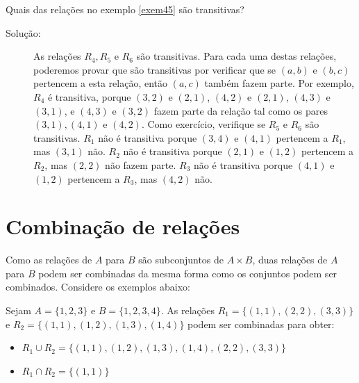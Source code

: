 \label{exem48}
\begin{exmp}
Quais das relações no exemplo \ref{exem45} são transitivas?

\begin{description}
\item[Solução:]As relações $R_4, R_5$ e $R_6$ são transitivas. Para cada uma
destas relações, poderemos provar que são transitivas por verificar que se
$(a,b)$ e $(b,c)$ pertencem a esta relação, então $(a,c)$ também fazem parte.
Por exemplo, $R_4$ é transitiva, porque $(3,2)$ e $(2,1)$, $(4,2)$ e $(2,1)$,
$(4,3)$ e $(3,1)$, e $(4,3)$ e $(3,2)$ fazem parte da relação tal como os pares
$(3,1),(4,1)$ e $(4,2)$. Como exercício, verifique se $R_5$ e $R_6$ são
transitivas. $R_1$ não é transitiva porque $(3,4)$ e $(4,1)$ pertencem a $R_1$,
mas $(3,1)$ não. $R_2$ não é transitiva porque $(2,1)$ e $(1,2)$ pertencem a
$R_2$, mas $(2,2)$ não fazem parte. $R_3$ não é transitiva porque $(4,1)$ e
$(1,2)$ pertencem a $R_3$, mas $(4,2)$ não.
\end{description}
\end{exmp}


	
\section{Combinação de relações}

Como as relações de $A$ para $B$ são subconjuntos de $A \times B$, duas
relações de $A$ para $B$ podem ser combinadas da mesma forma como os conjuntos
podem ser combinados. Considere os exemplos abaixo:

\label{exem49}
\begin{exmp}
Sejam $A = \{1,2,3\}$ e $B = \{1,2,3,4\}$. As relações $R_1 = \{(1, 1), (2, 2),
(3, 3)\}$ e $R_2 = \{(1, 1), (1, 2), (1, 3), (1, 4)\}$ podem ser combinadas
para obter:
\begin{itemize}
	\item $R_1 \cup R_2 = \{(1, 1), (1, 2), (1, 3), (1, 4), (2, 2), (3, 3)\}$
	\item $R_1 \cap R_2 = \{(1,1)\}$
\end{itemize}
\end{exmp}

